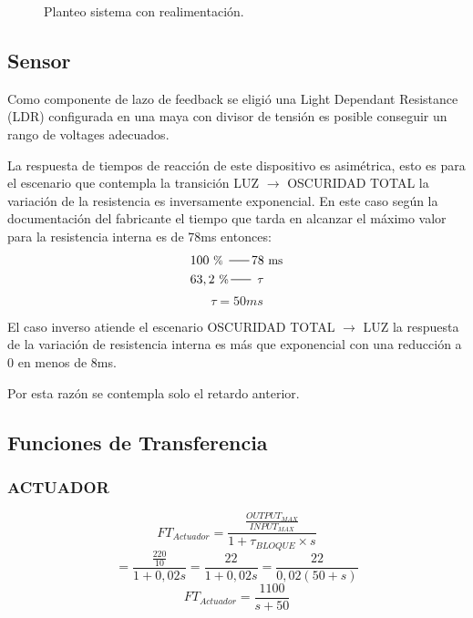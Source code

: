 \documentclass[a4paper,11pt]{article}
\begin{document}
\begin{figure}[H] %
	\caption{Planteo sistema con realimentación.}
	\label{fig:sistema_con_retro}
\end{figure} 
\subsection{Sensor}
Como componente de lazo de feedback se eligió una Light Dependant Resistance (LDR) configurada en una maya con divisor de tensión es posible conseguir un rango de voltages adecuados.

La respuesta de tiempos de reacción de este dispositivo es asimétrica, esto es para el escenario que contempla la transición LUZ $\rightarrow$ OSCURIDAD TOTAL la variación de la resistencia es inversamente exponencial.
En este caso según la documentación del fabricante el tiempo que tarda en alcanzar el máximo valor para la resistencia interna es de 78ms entonces:
\begin{align*}
& 100~\text{\small \% } \,\rule[2.5pt]{16pt}{0.5pt}\,
78~\text{\small ms}\\
& 63,2~\text{\small \%} \,\rule[2.5pt]{16pt}{0.5pt}\,
~\text{\small $\tau$}
\end{align*}
$$\tau = 50ms$$

El caso inverso atiende el escenario OSCURIDAD TOTAL $\rightarrow$ LUZ la respuesta de la variación de resistencia interna es más que exponencial con una reducción a 0 en menos de 8ms.

Por esta razón se contempla solo el retardo anterior.

\subsection{Funciones de Transferencia}
\subsubsection{ACTUADOR}
$$FT_{Actuador} =\frac{\frac{OUTPUT_{MAX}}{INPUT_{MAX}}}{1+\tau_{BLOQUE}\times s}$$
$$=\frac{\frac{220}{10}}{1+0,02 s}=\frac{22}{1+0,02 s}=\frac{22}{0,02(50+s)}$$
$$FT_{Actuador} = \frac{1100}{s+50}$$
\end{document}
